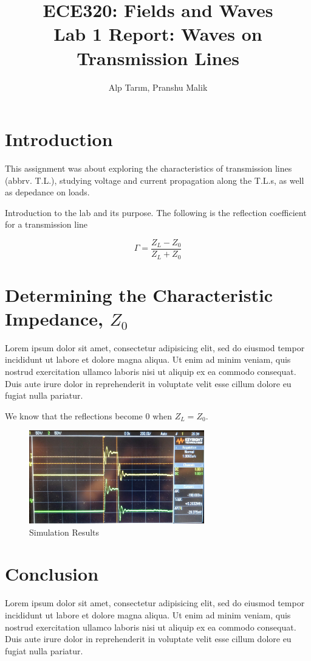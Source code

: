 \documentclass[10pt]{article}
\begin{document}
\title{\textbf{\Large{\textsc{ECE320:} Fields and Waves}} \\ \Large{Lab 1 Report: Waves on Transmission Lines}}
\author{Alp Tarım, Pranshu Malik}


\maketitle

\section{Introduction}
This assignment was about exploring the characteristics of transmission lines (abbrv. T.L.), studying voltage and current 
propagation along the T.L.s, as well as depedance on loads.

Introduction to the lab and its purpose. The following is the reflection coefficient for a transmission line

\[
    \label{simple_equation}
    \Gamma = \frac{Z_L - Z_0}{Z_L + Z_0}
\]

\section{Determining the Characteristic Impedance, $Z_0$}

Lorem ipsum dolor sit amet, consectetur adipisicing elit, sed do eiusmod tempor
incididunt ut labore et dolore magna aliqua. Ut enim ad minim veniam, quis
nostrud exercitation ullamco laboris nisi ut aliquip ex ea commodo consequat.
Duis aute irure dolor in reprehenderit in voluptate velit esse cillum dolore eu
fugiat nulla pariatur.

We know that the reflections become 0 when $Z_L = Z_0$.

\begin{figure}
    \centering
    \includegraphics[width=3.0in]{photos/lab1/test.jpg}
    \caption{Simulation Results}
    \label{simulationfigure}
\end{figure}


\section{Conclusion}

Lorem ipsum dolor sit amet, consectetur adipisicing elit, sed do eiusmod tempor
incididunt ut labore et dolore magna aliqua. Ut enim ad minim veniam, quis
nostrud exercitation ullamco laboris nisi ut aliquip ex ea commodo consequat.
Duis aute irure dolor in reprehenderit in voluptate velit esse cillum dolore eu
fugiat nulla pariatur.
\end{document}
